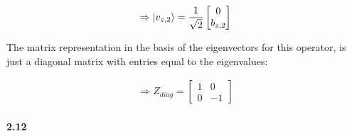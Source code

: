 \begin{align}
  \label{eq:2.11.29}
  \Rightarrow \ket{v_{z,2}} = \frac{1}{\sqrt{2}}
  \begin{bmatrix}
    0 \\
    b_{z,2}
  \end{bmatrix} 
\end{align}

The matrix representation in the basis of the eigenvectors for this operator, is just a diagonal matrix with entries equal to the eigenvalues:

\begin{align}
  \label{eq:2.11.30}
  \Rightarrow Z_{diag} =
  \begin{bmatrix}
    1 & 0 \\
    0 & -1
  \end{bmatrix} 
\end{align}


\paragraph{2.12} %











